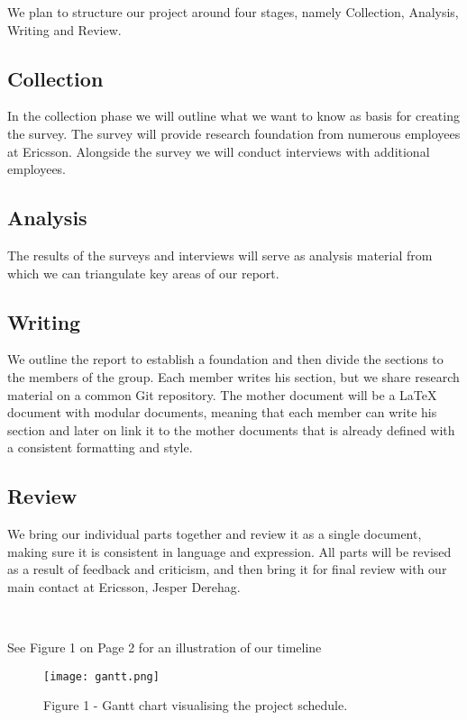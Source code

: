 \documentclass[ProjectPlan_innit.tex]{subfiles}
\begin{document}
We plan to structure our project around four stages, namely Collection, Analysis, Writing and Review. 

\subsection{Collection}
In the collection phase we will outline what we want to know as basis for creating the survey. The survey will provide research foundation from numerous employees at Ericsson. Alongside the survey we will conduct interviews with additional employees. 
\hspace{0pt}

\subsection{Analysis}
The results of the surveys and interviews will serve as analysis material from which we can triangulate key areas of our report.
\hspace{0pt}

\subsection{Writing}
We outline the report to establish a foundation and then divide the sections to the members of the group. Each member writes his section, but we share research material on a common Git repository. The mother document will be a LaTeX document with modular documents, meaning that each member can write his section and later on link it to the mother documents that is already defined with a consistent formatting and style.
\hspace{0pt}

\subsection{Review}
We bring our individual parts together and review it as a single document, making sure it is consistent in language and expression. All parts will be revised as a result of feedback and criticism, and then bring it for final review with our main contact at Ericsson, Jesper Derehag.  

\hspace{0pt} \

See Figure 1 on Page 2 for an illustration of our timeline

\begin{figure*}[H!]
	\texttt{[image: gantt.png]}
	\caption{Figure 1 - Gantt chart visualising the project schedule.}
	\label{AAA}
\end{figure*}
\end{document}

